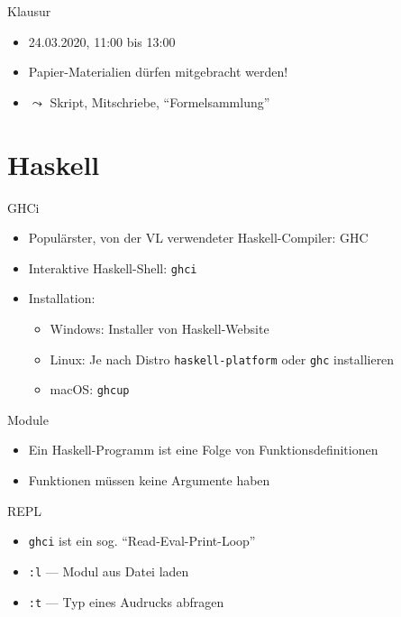 \documentclass{beamer}
\newcommand{\code}[1]{
	\begin{mdframed}
		
	\end{mdframed}
}
\begin{document}
\begin{frame}{Klausur}
	\begin{itemize}
		\item 24.03.2020, 11:00 bis 13:00
		\item Papier-Materialien dürfen mitgebracht werden!
		\item $\leadsto$ Skript, Mitschriebe, \enquote{Formelsammlung}
	\end{itemize}
\end{frame}

\section{Haskell}

\begin{frame}{GHCi}
	\code{code/ghci.output}

	\begin{itemize}
		\item Populärster, von der VL verwendeter Haskell-Compiler: GHC
		\item Interaktive Haskell-Shell: \texttt{ghci}
		\item Installation:
		\begin{itemize}
			\item Windows: Installer von Haskell-Website
			\item Linux: Je nach Distro \texttt{haskell-platform} oder \texttt{ghc} installieren
			\item macOS: \texttt{ghcup}
		\end{itemize}
	\end{itemize}
\end{frame}

\begin{frame}{Module}
	\code{demos/Maths.hs}

	\begin{itemize}
		\item Ein Haskell-Programm ist eine Folge von Funktionsdefinitionen
		\item Funktionen müssen keine Argumente haben
	\end{itemize}
\end{frame}

\begin{frame}{REPL}
	\code{code/ghci-maths.output}

	\begin{itemize}
		\item \texttt{ghci} ist ein sog. \enquote{Read-Eval-Print-Loop}
		\item \texttt{:l} --- Modul aus Datei laden
		\item \texttt{:t} --- Typ eines Audrucks abfragen
	\end{itemize}
\end{frame}
\end{document}
